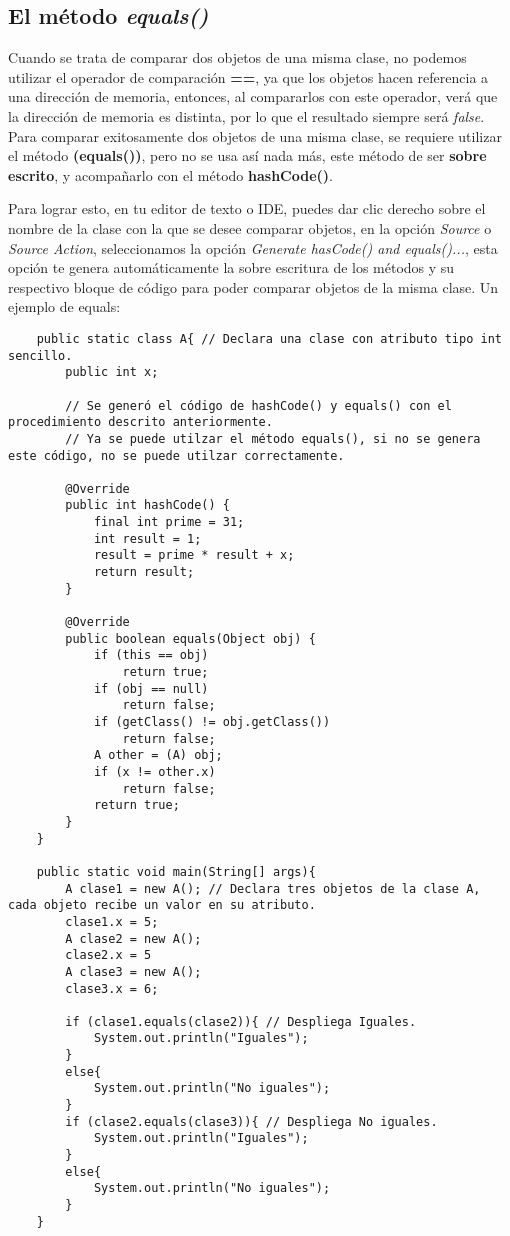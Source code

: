 \subsection{El método \textit{equals()}}

Cuando se trata de comparar dos objetos de una misma clase, no podemos utilizar el operador de comparación \textbf{==}, ya que los objetos hacen referencia a una dirección de memoria, entonces, al compararlos con este operador, verá que la dirección de memoria es distinta, por lo que el resultado siempre será \textit{false}. Para comparar exitosamente dos objetos de una misma clase, se requiere utilizar el método \textbf{(equals())}, pero no se usa así nada más, este método de ser \textbf{sobre escrito}, y acompañarlo con el método \textbf{hashCode()}.

Para lograr esto, en tu editor de texto o IDE, puedes dar clic derecho sobre el nombre de la clase con la que se desee comparar objetos, en la opción \textit{Source} o \textit{Source Action}, seleccionamos la opción \textit{Generate hasCode() and equals()...}, esta opción te genera automáticamente la sobre escritura de los métodos y su respectivo bloque de código para poder comparar objetos de la misma clase. Un ejemplo de equals:
\begin{lstlisting}
    public static class A{ // Declara una clase con atributo tipo int sencillo.
        public int x;
        
        // Se generó el código de hashCode() y equals() con el procedimiento descrito anteriormente.
        // Ya se puede utilzar el método equals(), si no se genera este código, no se puede utilzar correctamente.
        
        @Override
        public int hashCode() {
            final int prime = 31;
            int result = 1;
            result = prime * result + x;
            return result;
        }

        @Override
        public boolean equals(Object obj) {
            if (this == obj)
                return true;
            if (obj == null)
                return false;
            if (getClass() != obj.getClass())
                return false;
            A other = (A) obj;
            if (x != other.x)
                return false;
            return true;
        }
    }
    
    public static void main(String[] args){
        A clase1 = new A(); // Declara tres objetos de la clase A, cada objeto recibe un valor en su atributo.
        clase1.x = 5;
        A clase2 = new A();
        clase2.x = 5
        A clase3 = new A();
        clase3.x = 6;
        
        if (clase1.equals(clase2)){ // Despliega Iguales.
            System.out.println("Iguales"); 
        }
        else{
            System.out.println("No iguales");
        }
        if (clase2.equals(clase3)){ // Despliega No iguales.
            System.out.println("Iguales");
        }
        else{
            System.out.println("No iguales");
        }
    }
\end{lstlisting}


